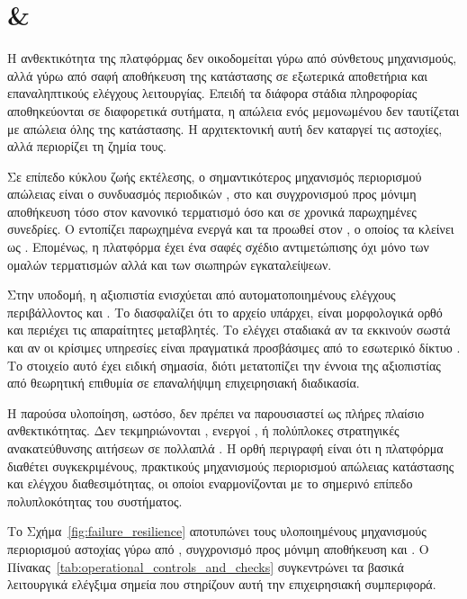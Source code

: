 \section{ \& }
\label{sec:failure_resilience}

Η ανθεκτικότητα της πλατφόρμας δεν οικοδομείται γύρω από σύνθετους  μηχανισμούς, αλλά γύρω από σαφή αποθήκευση της κατάστασης σε εξωτερικά αποθετήρια και επαναληπτικούς ελέγχους λειτουργίας. Επειδή τα διάφορα στάδια πληροφορίας αποθηκεύονται σε διαφορετικά συτήματα, η απώλεια ενός μεμονωμένου  δεν ταυτίζεται με απώλεια όλης της κατάστασης. Η αρχιτεκτονική αυτή δεν καταργεί τις αστοχίες, αλλά περιορίζει τη ζημία τους.

Σε επίπεδο κύκλου ζωής εκτέλεσης, ο σημαντικότερος μηχανισμός περιορισμού απώλειας είναι ο συνδυασμός περιοδικών ,  στο  και συγχρονισμού προς μόνιμη αποθήκευση τόσο στον κανονικό τερματισμό όσο και σε χρονικά παρωχημένες συνεδρίες. Ο \texttt{} εντοπίζει παρωχημένα ενεργά  και τα προωθεί στον \texttt{}, ο οποίος τα κλείνει ως . Επομένως, η πλατφόρμα έχει ένα σαφές σχέδιο αντιμετώπισης όχι μόνο των ομαλών τερματισμών αλλά και των σιωπηρών εγκαταλείψεων.

Στην υποδομή, η αξιοπιστία ενισχύεται από αυτοματοποιημένους ελέγχους περιβάλλοντος και . Το \texttt{} διασφαλίζει ότι το αρχείο \texttt{} υπάρχει, είναι μορφολογικά ορθό και περιέχει τις απαραίτητες μεταβλητές. Το \texttt{} ελέγχει σταδιακά αν τα  εκκινούν σωστά και αν οι κρίσιμες υπηρεσίες είναι πραγματικά προσβάσιμες από το εσωτερικό δίκτυο . Το στοιχείο αυτό έχει ειδική σημασία, διότι μετατοπίζει την έννοια της αξιοπιστίας από θεωρητική επιθυμία σε επαναλήψιμη επιχειρησιακή διαδικασία.

Η παρούσα υλοποίηση, ωστόσο, δεν πρέπει να παρουσιαστεί ως πλήρες πλαίσιο ανθεκτικότητας. Δεν τεκμηριώνονται , ενεργοί ,  ή πολύπλοκες στρατηγικές ανακατεύθυνσης αιτήσεων σε πολλαπλά . Η ορθή περιγραφή είναι ότι η πλατφόρμα διαθέτει συγκεκριμένους, πρακτικούς μηχανισμούς περιορισμού απώλειας κατάστασης και ελέγχου διαθεσιμότητας, οι οποίοι εναρμονίζονται με το σημερινό επίπεδο πολυπλοκότητας του συστήματος.

Το Σχήμα~\ref{fig:failure_resilience} αποτυπώνει τους υλοποιημένους μηχανισμούς περιορισμού αστοχίας γύρω από , συγχρονισμό προς μόνιμη αποθήκευση και . Ο Πίνακας~\ref{tab:operational_controls_and_checks} συγκεντρώνει τα βασικά λειτουργικά ελέγξιμα σημεία που στηρίζουν αυτή την επιχειρησιακή συμπεριφορά.


